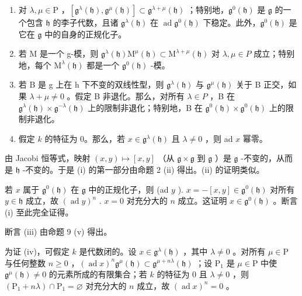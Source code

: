 \begin{enumerate}
\def\labelenumi{(\roman{enumi})}
\item
  对 \(\lambda, \mu \in \mathrm{P}\) ，\([\mathfrak{g}^{\lambda}(\mathfrak{h}), \mathfrak{g}^{\mu}(\mathfrak{h})] \subset \mathfrak{g}^{\lambda + \mu}(\mathfrak{h})\) ；特别地，\(\mathfrak{g}^{0}(\mathfrak{h})\) 是 \(\mathfrak{g}\) 的一个包含 \(\mathfrak{h}\) 的李子代数，且诸 \(\mathfrak{g}^{\lambda}(\mathfrak{h})\) 在 \(\operatorname{ad} \mathfrak{g}^{0}(\mathfrak{h})\) 下稳定。此外，\(\mathfrak{g}^{0}(\mathfrak{h})\) 是它在 \(\mathfrak{g}\) 中的自身的正规化子。
\item
  若 M 是一个 g-模，则 \(\mathfrak{g}^{\lambda}(\mathfrak{h})\mathrm{M}^{\mu}(\mathfrak{h})\subset\mathrm{M}^{\lambda+\mu}(\mathfrak{h})\) 对 \(\lambda,\mu\in P\) 成立；特别地，每个 \(\mathrm{M}^{\lambda}(\mathfrak{h})\) 都是一个 \(\mathfrak{g}^{0}(\mathfrak{h})\) -模。
\item
  若 B 是 g 上在 h 下不变的双线性型，则 \(\mathfrak{g}^{\lambda}(\mathfrak{h})\) 与 \(\mathfrak{g}^{\mu}(\mathfrak{h})\) 关于 B 正交，如果 \(\lambda + \mu \neq 0\) 。假定 B 非退化。那么，对所有 \(\lambda \in P\) ，B 在 \(\mathfrak{g}^{\lambda}(\mathfrak{h}) \times \mathfrak{g}^{-\lambda}(\mathfrak{h})\) 上的限制非退化；特别地，B 在 \(\mathfrak{g}^{0}(\mathfrak{h}) \times \mathfrak{g}^{0}(\mathfrak{h})\) 上的限制非退化。
\item
  假定 \(k\) 的特征为 0。那么，若 \(x \in \mathfrak{g}^{\lambda}(\mathfrak{h})\) 且 \(\lambda \neq 0\) ，则 ad \(x\) 幂零。
\end{enumerate}

由 Jacobi 恒等式，映射 \((x,y)\mapsto [x,y]\) （从 \(\mathfrak{g}\times \mathfrak{g}\) 到 \(\mathfrak{g}\) ）是 \(\mathfrak{g}\) -不变的，从而是 \(\mathfrak{h}\) -不变的。于是 (i) 的第一部分由命题 2 (ii) 得出。(ii) 的证明类似。

若 \(x\) 属于 \(\mathfrak{g}^0(\mathfrak{h})\) 在 \(\mathfrak{g}\) 中的正规化子，则 (ad \(y\) ). \(x = -[x, y] \in \mathfrak{g}^0(\mathfrak{h})\) 对所有 \(y \in \mathfrak{h}\) 成立，故 \((\operatorname{ad} y)^n\) . \(x = 0\) 对充分大的 \(n\) 成立。这证明 \(x \in \mathfrak{g}^0(\mathfrak{h})\) 。断言 (i) 至此完全证得。

断言 (iii) 由命题 9 (v) 得出。

为证 (iv)，可假定 \(k\) 是代数闭的。设 \(x \in \mathfrak{g}^{\lambda}(\mathfrak{h})\) ，其中 \(\lambda \neq 0\) 。对所有 \(\mu \in \mathrm{P}\) 与任何整数 \(n \geq 0\) ，\((\operatorname{ad} x)^n \mathfrak{g}^\mu(\mathfrak{h}) \subset \mathfrak{g}^{\mu + n\lambda}(\mathfrak{h})\) ；设 \(\mathrm{P}_1\) 是 \(\mu \in \mathrm{P}\) 中使 \(\mathfrak{g}^\mu(\mathfrak{h}) \neq 0\) 的元素所成的有限集合；若 \(k\) 的特征为 0 且 \(\lambda \neq 0\) ，则 \((\mathrm{P}_1 + n\lambda) \cap \mathrm{P}_1 = \varnothing\) 对充分大的 \(n\) 成立，故 \((\operatorname{ad} x)^n = 0\) 。

